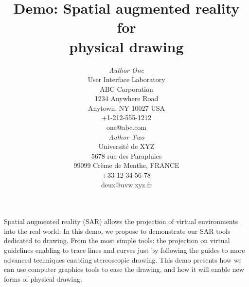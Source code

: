 \documentclass{article}
\begin{document}




\title{Demo: Spatial augmented reality for \\
       physical drawing}


\author{
\parbox[t]{9cm}{\centering
	     {\em Author One}\\
	     User Interface Laboratory\\
             ABC Corporation\\
	     1234 Anywhere Road\\
	     Anytown, NY 10027 USA\\
	     +1-212-555-1212\\
	     one@abc.com}
\parbox[t]{9cm}{\centering
	     {\em Author Two}\\
	     Universit\'{e} de XYZ\\
	     5678 rue des Parapluies\\
	     99099 Cr\`{e}me de Menthe, FRANCE\\
	     +33-12-34-56-78\\
	     deux@uvw.xyz.fr}
}

\maketitle

\abstract
Spatial augmented reality (SAR) allows the projection of virtual environments into the real world. In this demo, we propose to demonstrate our SAR tools dedicated to drawing. 
From the most simple tools: the projection on virtual guidelines enabling to trace lines and curves just by following the guides to more advanced techniques enabling stereoscopic drawing. This demo presents how we can use computer graphics tools to ease the drawing, and how it will enable new forms of physical drawing. 
\end{document}
